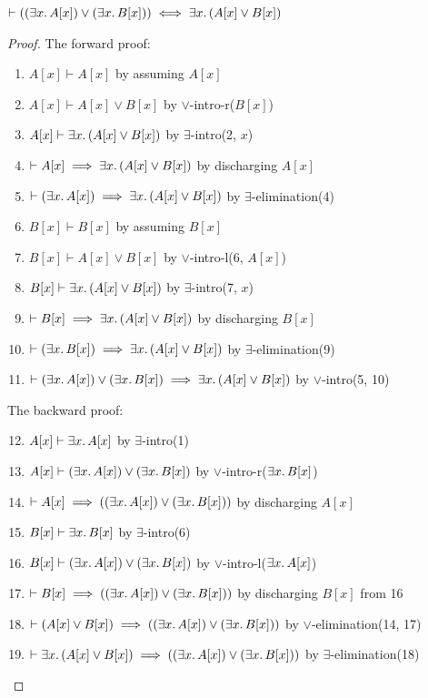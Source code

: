 \begin{node}%
$\vdash((\exists x\ldotp A[x])\lor(\exists x\ldotp B[x]))\iff\exists x\ldotp(A[x]\lor B[x])$
\end{node}

\begin{proof}
The forward proof:
\begin{enumerate}
\item $A[x]\vdash A[x]$ by assuming $A[x]$%
\item $A[x]\vdash A[x]\lor B[x]$ by $\lor$-intro-r($B[x]$)%
\item $A[x]\vdash\exists x\ldotp(A[x]\lor B[x])$ by $\exists$-intro(2, $x$)%
\item $\vdash A[x]\implies\exists x\ldotp(A[x]\lor B[x])$ by
  discharging $A[x]$%
\item $\vdash(\exists x\ldotp A[x])\implies\exists x\ldotp(A[x]\lor B[x])$ by
  $\exists$-elimination(4)%
\item $B[x]\vdash B[x]$ by assuming $B[x]$%
\item $B[x]\vdash A[x]\lor B[x]$ by $\lor$-intro-l(6, $A[x]$)%
\item $B[x]\vdash\exists x\ldotp(A[x]\lor B[x])$ by $\exists$-intro(7, $x$)%
\item $\vdash B[x]\implies\exists x\ldotp(A[x]\lor B[x])$ by
  discharging $B[x]$%
\item $\vdash(\exists x\ldotp B[x])\implies\exists x\ldotp(A[x]\lor B[x])$ by
  $\exists$-elimination(9)%
\item $\vdash(\exists x\ldotp A[x])\lor(\exists x\ldotp B[x])\implies\exists x\ldotp(A[x]\lor B[x])$
  by $\lor$-intro(5, 10)%
\end{enumerate}
The backward proof:
\begin{enumerate}\setcounter{enumi}{11}
\item $A[x]\vdash \exists x\ldotp A[x]$ by $\exists$-intro(1)%
\item $A[x]\vdash(\exists x\ldotp A[x])\lor(\exists x\ldotp B[x])$ by $\lor$-intro-r($\exists x\ldotp B[x]$)%
\item $\vdash A[x]\implies((\exists x\ldotp A[x])\lor(\exists x\ldotp B[x]))$
  by discharging $A[x]$%
\item $B[x]\vdash\exists x\ldotp B[x]$ by $\exists$-intro(6)%
\item $B[x]\vdash(\exists x\ldotp A[x])\lor(\exists x\ldotp B[x])$ by $\lor$-intro-l($\exists x\ldotp A[x]$)%
\item $\vdash B[x]\implies((\exists x\ldotp A[x])\lor(\exists x\ldotp B[x]))$
  by discharging $B[x]$ from 16%
\item $\vdash (A[x]\lor B[x])\implies((\exists x\ldotp A[x])\lor(\exists x\ldotp B[x]))$
  by $\lor$-elimination(14, 17)%
\item $\vdash\exists x\ldotp(A[x]\lor B[x])\implies((\exists x\ldotp A[x])\lor(\exists x\ldotp B[x]))$
  by $\exists$-elimination(18)\qedhere
\end{enumerate}
\end{proof}


